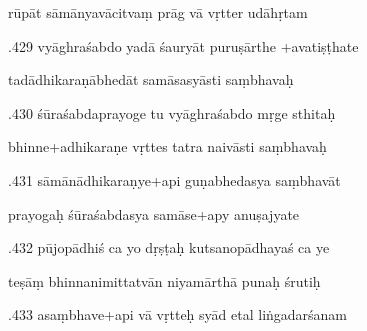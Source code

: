 \documentclass[article,12pt,a4paper]{memoir}%
\newcounter{parCount}
\begin{document}
	  
	  \pstart \leavevmode%
	rūpāt sāmānyavācitvaṃ prāg vā vṛtter udāhṛtam 
	{}
	\pend%
      

	  
	  \pstart {}.429 vyāghraśabdo yadā śauryāt puruṣārthe +avatiṣṭhate 
	{}
	\pend%
      

	  
	  \pstart \leavevmode%
	tadādhikaraṇābhedāt samāsasyāsti saṃbhavaḥ 
	{}
	\pend%
      

	  
	  \pstart {}.430 śūraśabdaprayoge tu vyāghraśabdo mṛge sthitaḥ 
	{}
	\pend%
      

	  
	  \pstart \leavevmode%
	bhinne+adhikaraṇe vṛttes tatra naivāsti saṃbhavaḥ 
	{}
	\pend%
      

	  
	  \pstart {}.431 sāmānādhikaraṇye+api guṇabhedasya saṃbhavāt 
	{}
	\pend%
      

	  
	  \pstart \leavevmode%
	prayogaḥ śūraśabdasya samāse+apy anuṣajyate 
	{}
	\pend%
      

	  
	  \pstart {}.432 pūjopādhiś ca yo dṛṣṭaḥ kutsanopādhayaś ca ye 
	{}
	\pend%
      

	  
	  \pstart \leavevmode%
	teṣāṃ bhinnanimittatvān niyamārthā punaḥ śrutiḥ 
	{}
	\pend%
      

	  
	  \pstart {}.433 asaṃbhave+api vā vṛtteḥ syād etal liṅgadarśanam 
	{}
	\pend%
      
\end{document}
